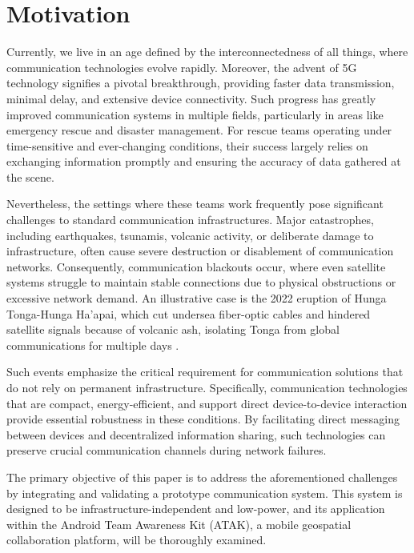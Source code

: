 \section{Motivation}

Currently, we live in an age defined by the interconnectedness of all things, where communication technologies evolve rapidly. 
Moreover, the advent of 5G technology signifies a pivotal breakthrough, providing faster data transmission, minimal delay, and extensive device connectivity. 
Such progress has greatly improved communication systems in multiple fields, particularly in areas like emergency rescue and disaster management. 
For rescue teams operating under time-sensitive and ever-changing conditions, their success largely relies on exchanging information promptly and ensuring the accuracy of data gathered at the scene.

\par

Nevertheless, the settings where these teams work frequently pose significant challenges to standard communication infrastructures. 
Major catastrophes, including earthquakes, tsunamis, volcanic activity, or deliberate damage to infrastructure, often cause severe destruction or disablement of communication networks. 
Consequently, communication blackouts occur, where even satellite systems struggle to maintain stable connections due to physical obstructions or excessive network demand. 
An illustrative case is the 2022 eruption of Hunga Tonga-Hunga Ha'apai, which cut undersea fiber-optic cables and hindered satellite signals because of volcanic ash, isolating Tonga from global communications for multiple days  \cite{Tonga}.

\par

Such events emphasize the critical requirement for communication solutions that do not rely on permanent infrastructure. 
Specifically, communication technologies that are compact, energy-efficient, and support direct device-to-device interaction provide essential robustness in these conditions. 
By facilitating direct messaging between devices and decentralized information sharing, such technologies can preserve crucial communication channels during network failures.

\par
The primary objective of this paper is to address the aforementioned challenges by integrating and validating a prototype communication system. This system is designed to be infrastructure-independent and low-power, and its application within the Android Team Awareness Kit (ATAK), a mobile geospatial collaboration platform, will be thoroughly examined.

